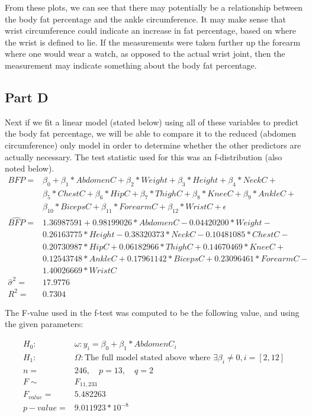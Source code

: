 \documentclass[a4paper, 11pt]{article}
\begin{document}
From these plots, we can see that there may potentially be a relationship between the body fat percentage and the ankle circumference. It may make sense that wrist circumference could  indicate an increase in fat percentage, based on where the wrist is defined to lie. If the measurements were taken further up the forearm where one would wear a watch, as opposed to the actual wrist joint, then the measurement may indicate something about the body fat percentage.

\subsection*{Part D}
Next if we fit a linear model (stated below) using all of these variables to predict the body fat percentage, we will be able to compare it to the reduced (abdomen circumference) only model in order to determine whether the other predictors are actually necessary. The test statistic used for this was an f-distribution (also noted below).
\begin{align*}
 BFP = & \beta_0 + \beta_1*AbdomenC + \beta_2*Weight + \beta_3*Height + \beta_4*NeckC + \\ 
 & \beta_5*ChestC + \beta_6*HipC + \beta_7*ThighC + \beta_8*KneeC + \beta_9*AnkleC + \\ 
 &\beta_10*BicepsC + \beta_11*ForearmC + \beta_12*WristC + \epsilon\\
  \widehat{BFP} = & 1.36987591 + 0.98199026*AbdomenC - 0.04420200*Weight - \\
  &0.26163775*Height - 0.38320373*NeckC - 0.10481085*ChestC - \\
  & 0.20730987*HipC + 0.06182966*ThighC + 0.14670469*KneeC + \\
  &0.12543748*AnkleC + 0.17961142*BicepsC + 0.23096461*ForearmC - \\ 
  &1.40026669*WristC\\
\hat{\sigma}^2=& 17.9776\\
R^2 = &0.7304
\end{align*}

The F-value used in the f-test was computed to be the following value, and using the given parameters:

\begin{align*}
	 H_0:\quad &\omega: y_i = \beta_0 + \beta_1 * AbdomenC_i \\
	 H_1:\quad &\Omega: \text{The full model stated above where } \exists \beta_i \ne 0, i = [2, 12]\\
	 n = &246, \quad p = 13, \quad q = 2 \\
	 F \sim& F_{11, 233}\\
	 F_{value} = &5.482263\\
	 p-value = &9.011923*10^{-8}
\end{align*}
\end{document}
